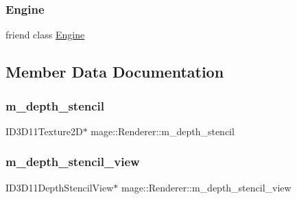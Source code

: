 \subsubsection{\texorpdfstring{Engine}{Engine}}
{\footnotesize\ttfamily friend class \hyperlink{classmage_1_1_engine}{Engine}\hspace{0.3cm}{\ttfamily [friend]}}



\subsection{Member Data Documentation}
\hypertarget{classmage_1_1_renderer_a1c19b2fb0347ab2e93f19d7a9d53a947}{}\label{classmage_1_1_renderer_a1c19b2fb0347ab2e93f19d7a9d53a947} 
\subsubsection{\texorpdfstring{m\+\_\+depth\+\_\+stencil}{m\_depth\_stencil}}
{\footnotesize\ttfamily I\+D3\+D11\+Texture2D$\ast$ mage\+::\+Renderer\+::m\+\_\+depth\+\_\+stencil\hspace{0.3cm}{\ttfamily [protected]}}

\hypertarget{classmage_1_1_renderer_a85b04ce9e3d0086c499910b2df82876d}{}\label{classmage_1_1_renderer_a85b04ce9e3d0086c499910b2df82876d} 
\subsubsection{\texorpdfstring{m\+\_\+depth\+\_\+stencil\+\_\+view}{m\_depth\_stencil\_view}}
{\footnotesize\ttfamily I\+D3\+D11\+Depth\+Stencil\+View$\ast$ mage\+::\+Renderer\+::m\+\_\+depth\+\_\+stencil\+\_\+view\hspace{0.3cm}{\ttfamily [protected]}}

\hypertarget{classmage_1_1_renderer_a5af9d44e53bd523136cc52855a2dbe25}{}\label{classmage_1_1_renderer_a5af9d44e53bd523136cc52855a2dbe25} 
